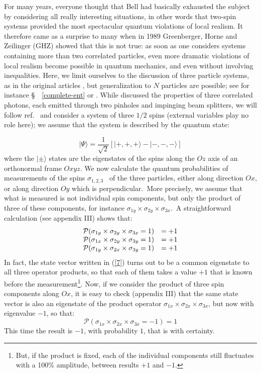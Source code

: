 \documentclass[12pt,onecolumn]{article}%
\begin{document}
For many years, everyone thought that Bell had basically exhausted the subject
by considering all really interesting situations, in other words that two-spin
systems provided the most spectacular quantum violations of local realism. It
therefore came as a surprise to many when in 1989 Greenberger, Horne and
Zeilinger (GHZ) showed that this is not true: as soon as one considers systems
containing more than two correlated particles, even more dramatic violations
of local realism become possible in quantum mechanics, and even without
involving inequalities. Here, we limit ourselves to the discussion of three
particle systems, as in the original articles \cite{GHZ} \cite{GHZ-bis}, but
generalization to $N$ particles are possible; see for instance
\S \ \ \ref{complete-ent} or \cite{FL2}. While \cite{GHZ-bis} discussed the
properties of three correlated photons, each emitted through two pinholes and
impinging beam splitters, we will follow ref.\ \cite{Mermin5} and consider a
system of three $1/2$ spins (external variables play no role here); we assume
that the system is described by the quantum state:%

\begin{equation}
|\Psi\rangle =\frac{1}{\sqrt{2}}\left[  |+,+,+\rangle -|-,-,-\rangle \right]  \label{7}%
\end{equation}
where the $|\pm\rangle$ states are the eigenstates of the spins along the $Oz$
axis of an orthonormal frame $Oxyz$. We now calculate the quantum
probabilities of measurements of the spins $\sigma_{1,2,3}$ \ of the three
particles, either along direction $Ox$, or along direction $Oy$ which is
perpendicular.\ More precisely, we assume that what is measured is not
individual spin components, but only the product of three of these components,
for instance $\sigma_{1y}\times\sigma_{2y}\times\sigma_{3x}$.\ A
straightforward calculation (see appendix III) shows that:
\begin{equation}%
\begin{array}
[c]{ll}%
\mathcal{P}(\sigma_{1y}\times\sigma_{2y}\times\sigma_{3x}=1) & =+1\\
\mathcal{P}(\sigma_{1x}\times\sigma_{2y}\times\sigma_{3y}=1) & =+1\\
\mathcal{P}(\sigma_{1y}\times\sigma_{2x}\times\sigma_{3y}=1) & =+1
\end{array}
\label{8}%
\end{equation}
In fact, the state vector written in (\ref{7}) turns out to be a common
eigenstate to all three operator products, so that each of them takes a value
$+1$ that is known before the measurement\footnote{But, if the product is
fixed, each of the individual components still fluctuates with a 100\%
amplitude, between results $+1$ and $-1$.}. Now, if we consider the product of
three spin components along $Ox$, it is easy to check (appendix III) that the
same state vector is also an eigenstate of the product operator $\sigma
_{1x}\times\sigma_{2x}\times\sigma_{3x}$, but now with eigenvalue $-1$, so
that:
\begin{equation}
\mathcal{P}(\sigma_{1x}\times\sigma_{2x}\times\sigma_{3x}=-1)=1 \label{9}%
\end{equation}
This time the result is $-1$, with probability $1$, that is with certainty.
\end{document}
